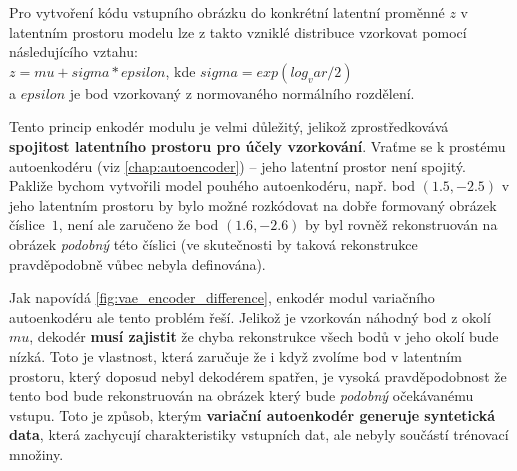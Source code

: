 Pro vytvoření kódu vstupního obrázku do konkrétní latentní proměnné $z$ v latentním prostoru modelu lze z takto vzniklé distribuce vzorkovat pomocí následujícího vztahu:\\
$z = mu + sigma * epsilon$, kde $sigma = exp(log_var / 2)$ \\
a $epsilon$ je bod vzorkovaný z normovaného normálního rozdělení.

Tento princip enkodér modulu je velmi důležitý, jelikož zprostředkovává \textbf{spojitost latentního prostoru pro účely vzorkování}.
Vraťme se k prostému autoenkodéru (viz \autoref{chap:autoencoder}) – jeho latentní prostor není spojitý.
Pakliže bychom vytvořili model pouhého autoenkodéru, např. bod $(1.5, -2.5)$ v jeho latentním prostoru by bylo možné rozkódovat na dobře formovaný obrázek číslice $1$, není ale zaručeno že bod $(1.6, -2.6)$ by byl rovněž rekonstruován na obrázek \emph{podobný} této číslici (ve skutečnosti by taková rekonstrukce pravděpodobně vůbec nebyla definována).

Jak napovídá \autoref{fig:vae_encoder_difference}, enkodér modul variačního autoenkodéru ale tento problém řeší.
Jelikož je vzorkován náhodný bod z okolí $mu$, dekodér \textbf{musí zajistit} že chyba rekonstrukce všech bodů v jeho okolí bude nízká.
Toto je vlastnost, která zaručuje že i když zvolíme bod v latentním prostoru, který doposud nebyl dekodérem spatřen, je vysoká pravděpodobnost že tento bod bude rekonstruován na obrázek který bude \emph{podobný} očekávanému vstupu.
Toto je způsob, kterým \textbf{variační autoenkodér generuje syntetická data}, která zachycují charakteristiky vstupních dat, ale nebyly součástí trénovací množiny.



